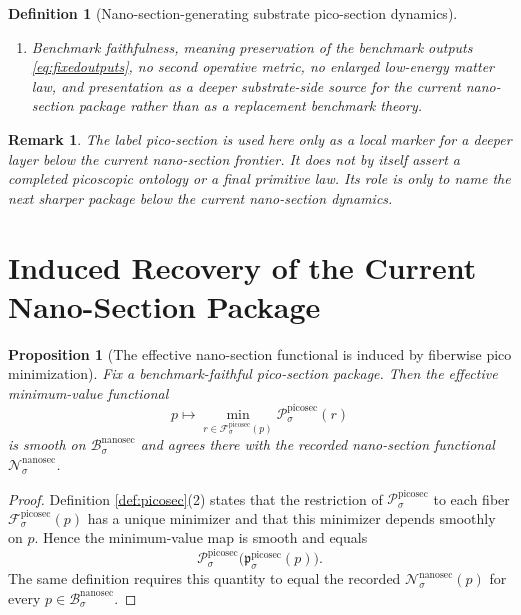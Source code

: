 \documentclass[11pt]{article}
\newcommand{\NanoSectionBody}[1]{\mathcal B_{#1}^{\mathrm{nanosec}}}
\newcommand{\NanoSectionFunctional}[1]{\mathscr N_{#1}^{\mathrm{nanosec}}}
\newcommand{\NanoSectionShell}[1]{\mathcal Z_{#1}^{\mathrm{nanosec}}}
\newcommand{\PicoSectionProj}[1]{\Pi_{#1}^{\mathrm{picosec}}}
\newcommand{\PicoSectionFiber}[2]{\mathcal F_{#1}^{\mathrm{picosec}}(#2)}
\newcommand{\PicoSectionNanoMin}[1]{\mathfrak p_{#1}^{\mathrm{picosec}}}
\newcommand{\PicoSectionFunctional}[1]{\mathscr P_{#1}^{\mathrm{picosec}}}
\newcommand{\PicoSectionShell}[1]{\mathcal Z_{#1}^{\mathrm{picosec}}}
\newtheorem{definition}{Definition}
\newtheorem{proposition}{Proposition}
\newtheorem{remark}{Remark}
\begin{document}
\begin{definition}[Nano-section-generating substrate pico-section dynamics]
\begin{enumerate}
\[\begin{array}{l}
    \PicoSectionFunctional{\sigma}(r)
    =
    \displaystyle\min_{s\in\PicoSectionFiber{\sigma}{\PicoSectionProj{\sigma}(r)}}
    \PicoSectionFunctional{\sigma}(s)
    \end{array}
    \right\},
    \]
    and
    \[
    \PicoSectionProj{\sigma}\big|_{\PicoSectionShell{\sigma}}
    :
    \PicoSectionShell{\sigma}
    \xrightarrow{\cong}
    \NanoSectionShell{\sigma}
    \]
    is a diffeomorphism.
    \item Benchmark faithfulness, meaning preservation of the benchmark outputs \eqref{eq:fixedoutputs}, no second operative metric, no enlarged low-energy matter law, and presentation as a deeper substrate-side source for the current nano-section package rather than as a replacement benchmark theory.
\end{enumerate}
\end{definition}

\begin{remark}
The label \emph{pico-section} is used here only as a local marker for a deeper layer below the current nano-section frontier. It does not by itself assert a completed picoscopic ontology or a final primitive law. Its role is only to name the next sharper package below the current nano-section dynamics.
\end{remark}

\section{Induced Recovery of the Current Nano-Section Package}

\begin{proposition}[The effective nano-section functional is induced by fiberwise pico minimization]
\label{prop:functional}
Fix a benchmark-faithful pico-section package. Then the effective minimum-value functional
\[
p\longmapsto
\min_{r\in\PicoSectionFiber{\sigma}{p}}
\PicoSectionFunctional{\sigma}(r)
\]
is smooth on \(\NanoSectionBody{\sigma}\) and agrees there with the recorded nano-section functional \(\NanoSectionFunctional{\sigma}\).
\end{proposition}

\begin{proof}
Definition \ref{def:picosec}(2) states that the restriction of \(\PicoSectionFunctional{\sigma}\) to each fiber \(\PicoSectionFiber{\sigma}{p}\) has a unique minimizer and that this minimizer depends smoothly on \(p\). Hence the minimum-value map is smooth and equals
\[
\PicoSectionFunctional{\sigma}\bigl(\PicoSectionNanoMin{\sigma}(p)\bigr).
\]
The same definition requires this quantity to equal the recorded \(\NanoSectionFunctional{\sigma}(p)\) for every \(p\in\NanoSectionBody{\sigma}\).
\end{proof}
\end{document}
